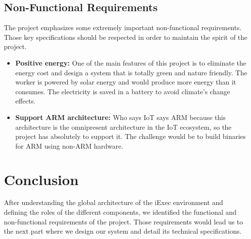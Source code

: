     \subsection{Non-Functional Requirements}
        The project emphasizes some extremely important non-functional requirements. Those key specifications should be
        respected in order to maintain the spirit of the project.
        \begin{itemize}
            \item \textbf{Positive energy:} One of the main features of this project is to eliminate the energy cost and
            design a system that is totally green and nature friendly. The worker is powered by solar energy and would
            produce more energy than it consumes. The electricity is saved in a battery to avoid climate's change effects.

            \item \textbf{Support ARM architecture:} Who says IoT says ARM\cite{ARM} because this architecture is the
            omnipresent architecture in the IoT ecosystem, so the project has absolutely to support it. The challenge
            would be to build binaries for ARM using non-ARM hardware.
        \end{itemize}

\section{Conclusion}
    After understanding the global architecture of the iExec environment and defining the roles of the different components,
    we identified the functional and non-functional requirements of the project. Those requirements would lead us to the next
    part where we design our system and detail its technical specifications.